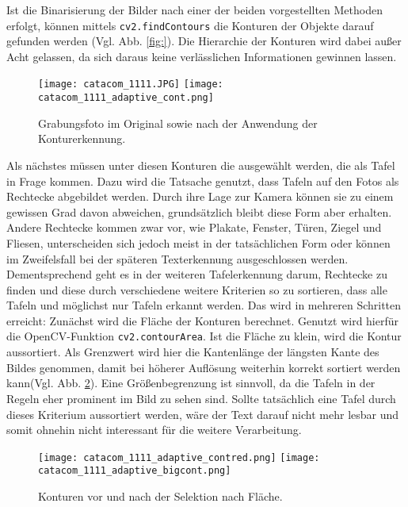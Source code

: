 Ist die Binarisierung der Bilder nach einer der beiden vorgestellten Methoden erfolgt, können mittels \verb|cv2.findContours| die Konturen der Objekte darauf gefunden werden (Vgl. Abb. \ref{fig:}). Die Hierarchie der Konturen wird dabei außer Acht gelassen, da sich daraus keine verlässlichen Informationen gewinnen lassen.
\begin{figure}[h!]
\texttt{[image: catacom\_1111.JPG]}
\texttt{[image: catacom\_1111\_adaptive\_cont.png]}
\caption{Grabungsfoto im Original sowie nach der Anwendung der Konturerkennung.}
\label{fig:adaptivecont}
\end{figure}
Als nächstes müssen unter diesen Konturen die ausgewählt werden, die als Tafel in Frage kommen. Dazu wird die Tatsache genutzt, dass Tafeln auf den Fotos als Rechtecke abgebildet werden. Durch ihre Lage zur Kamera können sie zu einem gewissen Grad davon abweichen, grundsätzlich bleibt diese Form aber erhalten. Andere Rechtecke kommen zwar vor, wie Plakate, Fenster, Türen, Ziegel und Fliesen, unterscheiden sich jedoch meist in der tatsächlichen Form oder können im Zweifelsfall bei der späteren Texterkennung ausgeschlossen werden. Dementsprechend geht es in der weiteren Tafelerkennung darum, Rechtecke zu finden und diese durch verschiedene weitere Kriterien so zu sortieren, dass alle Tafeln und möglichst nur Tafeln erkannt werden. Das wird in mehreren Schritten erreicht:
Zunächst wird die Fläche der Konturen berechnet. Genutzt wird hierfür die OpenCV-Funktion \verb|cv2.contourArea|. Ist die Fläche zu klein, wird die Kontur aussortiert. Als Grenzwert wird hier die Kantenlänge der längsten Kante des Bildes genommen, damit bei höherer Auflösung weiterhin korrekt sortiert werden kann(Vgl. Abb. \ref{fig:adaptivecontsize}). Eine Größenbegrenzung ist sinnvoll, da die Tafeln in der Regeln eher prominent im Bild zu sehen sind. Sollte tatsächlich eine Tafel durch dieses Kriterium aussortiert werden, wäre der Text darauf nicht mehr lesbar und somit ohnehin nicht interessant für die weitere Verarbeitung.
\begin{figure}[h!]
\texttt{[image: catacom\_1111\_adaptive\_contred.png]}
\texttt{[image: catacom\_1111\_adaptive\_bigcont.png]}
\caption{Konturen vor und nach der Selektion nach Fläche.}
\label{fig:adaptivecontsize}
\end{figure}

